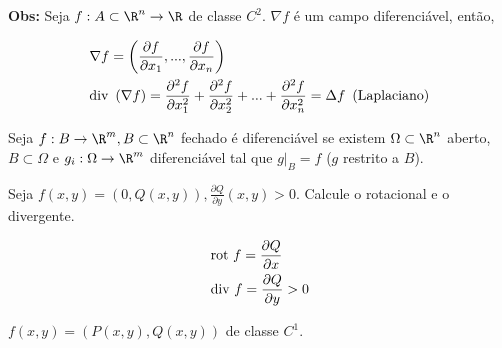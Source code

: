 \documentclass[11pt, oneside, a4paper]{gsm-l}
\begin{document}
\textbf{Obs:} Seja $f:A \subset \R^n  \to \R$ de classe $C^2$. $\nabla f$ é um campo diferenciável, então,

\[
\begin{gathered}
  \nabla f = \left( {\frac{{\partial f}}
{{\partial x_1 }},...,\frac{{\partial f}}
{{\partial x_n }}} \right) \hfill \\
  {\text{div }}\left( {\nabla f} \right) = \frac{{\partial ^2 f}}
{{\partial x_1^2 }} + \frac{{\partial ^2 f}}
{{\partial x_2^2 }} + ... + \frac{{\partial ^2 f}}
{{\partial x_n^2 }} = \Delta f{\text{ }}\left( {{\text{Laplaciano}}} \right) \hfill \\
\end{gathered}
\]

\begin{defi}
Seja $f:B \to \R^m ,B \subset \R^n$ fechado é diferenciável se existem $\Omega  \subset \R^n$ aberto, $B \subset \Omega$ e $g_i :\Omega  \to \R^m$ diferenciável tal que $\left. g \right|_B  = f$ ($g$ restrito a $B$).
\end{defi}

\begin{exem}
Seja $f\left( {x,y} \right) = \left( {0,Q\left( {x,y} \right)} \right),\displaystyle \frac{{\partial Q}}{{\partial y}}\left( {x,y} \right) > 0$. Calcule o rotacional e o divergente.
\end{exem}

\begin{sol}
\[
\begin{gathered}
  {\text{rot }}f = \frac{{\partial Q}}
{{\partial x}} \hfill \\
  {\text{div }}f = \frac{{\partial Q}}
{{\partial y}} > 0 \hfill \\
\end{gathered}
\]

\end{sol}

\begin{exem}
$f\left( {x,y} \right) = \left( {P\left( {x,y} \right),Q\left( {x,y} \right)} \right)$ de classe $C^1$.
\end{exem}
\end{document}

